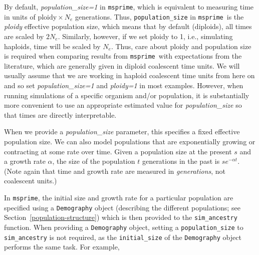 \documentclass[graybox]{svmult}
\newcommand{\msprime}[0]{\texttt{msprime}}
\begin{document}
By default, \emph{population\_size=1} in \msprime, which is equivalent to measuring
time in units of $\mbox{ploidy}\times N_e$ generations. Thus,
\texttt{population\_size} in \msprime\ is the \emph{ploidy} effective population size,
which means that by default (diploids), all times are scaled by \(2N_e\).
Similarly, however, if we set ploidy to 1, i.e., simulating haploids, time will be scaled by $N_e$.
Thus, care about ploidy
and population size is required when comparing results from \msprime\ with expectations from the literature, which
are generally given in diploid coalescent time units.
We will usually assume that we are working in haploid
coalescent time units from here on and so set \emph{population\_size=1} and \emph{ploidy=1} in most
examples. However, when running simulations of a specific organism and/or population, it
is substantially more convenient to use an appropriate estimated value
for \emph{population\_size} so that times are directly interpretable.

\label{exponentially-growingshrinking-populations}
When we provide a \emph{population\_size} parameter, this specifies a fixed effective
population size. We can also model populations that are exponentially
growing or contracting at some rate over time. Given a population size
at the present \(s\) and a growth rate \(\alpha\), the size of the
population \(t\) generations in the past is $s e^{-\alpha t}$. (Note
again that time and growth rate are measured in \emph{generations},
not coalescent units.)

In \msprime, the initial size and growth rate for a particular population
are specified using a \texttt{Demography} object 
(describing the different populations; see Section~\ref{population-structure})
which is then provided to the \texttt{sim\_ancestry} function. When providing a
\texttt{Demography} object, setting a \texttt{population\_size} to
\texttt{sim\_ancestry} is not required, as the \texttt{initial\_size} of the
\texttt{Demography} object performs the same task. For example,
\end{document}
